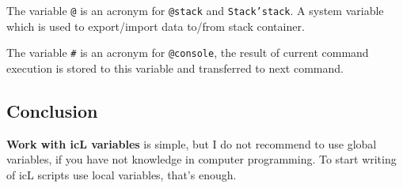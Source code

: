 {The variable \texttt{@}} is an acronym for \texttt{@stack} and \texttt{Stack'stack}. A system variable which is used to export/import data to/from stack container.

{The variable \texttt{#}} is an acronym for \texttt{@console}, the result of current command execution is stored to this variable and transferred to next command.

\subsection{Conclusion}

{\bf Work with icL variables} is simple, but I do not recommend to use global variables, if you have not knowledge in computer programming. To start writing of icL scripts use local variables, that's enough.

